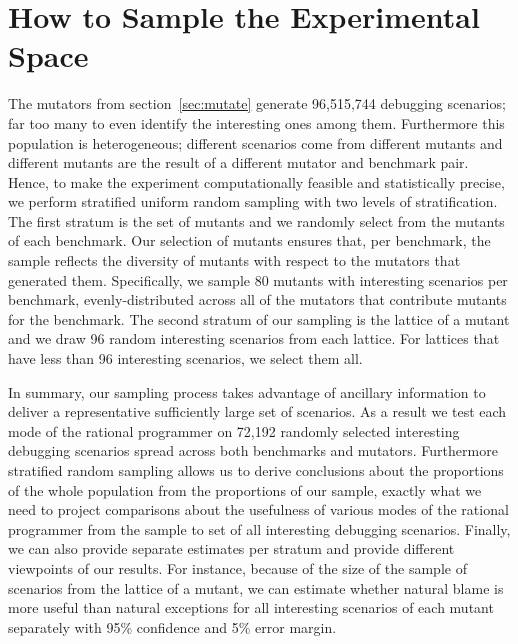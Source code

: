 \section{How to Sample the Experimental Space} 

The mutators from section~\ref{sec:mutate} generate 96,515,744 debugging
scenarios; far too many to even identify the interesting ones among them.
Furthermore this population is heterogeneous; different scenarios come
from different mutants and different mutants are the result of a
different mutator and benchmark pair. Hence, to make the experiment
computationally feasible and statistically precise, we perform stratified
uniform random sampling with two levels of stratification.  The first
stratum is the set of mutants and we randomly select from the mutants of
each benchmark.  Our selection of mutants ensures that, per
benchmark, the sample reflects the diversity of mutants with respect to
the mutators that generated them.  Specifically,  we sample 80 mutants
with interesting scenarios per benchmark,  evenly-distributed across all
of the mutators that contribute mutants for the benchmark.  The second
stratum of our sampling is the lattice of a mutant and we draw 96 random
interesting scenarios from each lattice. For lattices that have less than
96 interesting scenarios, we select them all.

In summary, our sampling process takes advantage of ancillary information
to deliver a representative sufficiently large set of scenarios. As a result we test each
mode of the rational programmer on 72,192 randomly selected interesting
debugging scenarios spread across both benchmarks and mutators.
Furthermore stratified random sampling allows us to derive conclusions
about the proportions of the whole population from the proportions of
our sample, exactly what we need to project comparisons about the
usefulness of various modes of the
rational programmer from the sample to set of all interesting debugging
scenarios.  Finally, we can also provide separate estimates per stratum and provide different
viewpoints of our results. For instance, because of the size of the sample
of scenarios from the lattice of a mutant, we can estimate whether natural
blame is more useful than natural exceptions for all interesting scenarios
of each mutant separately with 95\% confidence and 5\% error margin.

 



